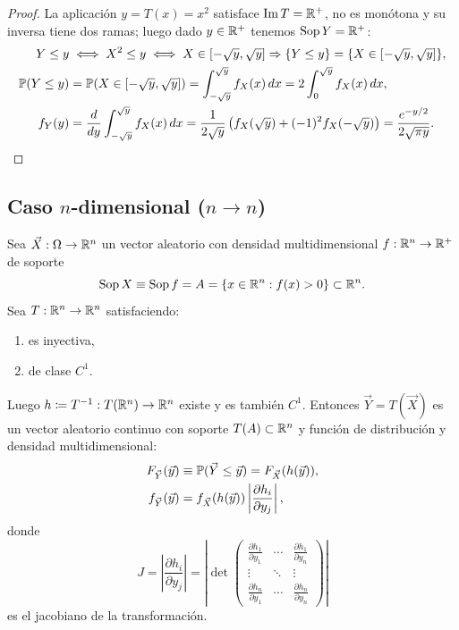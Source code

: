 {\begin{proof}
La aplicación $y = T(x) = x^2$ satisface $\operatorname{Im} T = \mathbb{R}^+$, no es monótona y su inversa tiene dos ramas; luego dado $y \in \mathbb{R}^+$ tenemos $\operatorname{Sop} Y = \mathbb{R}^+$:
\begin{align*}
  Y \le y &\iff X^2 \le y \iff X \in [-\sqrt{y}, \sqrt{y}] \Rightarrow \{Y \le y\} = \{X \in [-\sqrt{y}, \sqrt{y}]\}, \\
  \mathbb{P}(Y \le y) &= \mathbb{P}(X \in [-\sqrt{y}, \sqrt{y}]) = \int_{-\sqrt{y}}^{\sqrt{y}} f_X(x)\,dx = 2\int_0^{\sqrt{y}} f_X(x)\,dx, \\
  f_Y(y) &= \frac{d}{dy}\int_{-\sqrt{y}}^{\sqrt{y}} f_X(x)\,dx = \frac{1}{2\sqrt{y}}\left(f_X(\sqrt{y}) + (-1)^2 f_X(-\sqrt{y})\right) = \frac{e^{-y/2}}{2\sqrt{\pi y}}.
\end{align*}
\end{proof}}

\subsection{Caso $n$-dimensional ($n \to n$)}

\begin{proposicion}[27]
Sea $\vec{X} : \Omega \to \mathbb{R}^n$ un vector aleatorio con densidad multidimensional $f : \mathbb{R}^n \to \mathbb{R}^+$ de soporte
\[
  \operatorname{Sop} X \equiv \operatorname{Sop} f = A = \{x \in \mathbb{R}^n : f(x) > 0\} \subset \mathbb{R}^n.
\]
Sea $T : \mathbb{R}^n \to \mathbb{R}^n$ satisfaciendo:
\begin{enumerate}
  \item es inyectiva,
  \item de clase $C^1$.
\end{enumerate}
Luego $h \coloneqq T^{-1} : T(\mathbb{R}^n) \to \mathbb{R}^n$ existe y es también $C^1$. Entonces $\vec{Y} = T(\vec{X})$ es un vector aleatorio continuo con soporte $T(A) \subset \mathbb{R}^n$ y función de distribución y densidad multidimensional:
\begin{align*}
  F_{\vec{Y}}(\vec{y}) &\equiv \mathbb{P}(\vec{Y} \le \vec{y}) = F_{\vec{X}}(h(\vec{y})), \\
  f_{\vec{Y}}(\vec{y}) &= f_{\vec{X}}(h(\vec{y})) \left|\frac{\partial h_i}{\partial y_j}\right|,
\end{align*}
donde
\[
  J = \left|\frac{\partial h_i}{\partial y_j}\right| = \left|\det \begin{pmatrix} \frac{\partial h_1}{\partial y_1} & \cdots & \frac{\partial h_1}{\partial y_n} \\ \vdots & \ddots & \vdots \\ \frac{\partial h_n}{\partial y_1} & \cdots & \frac{\partial h_n}{\partial y_n} \end{pmatrix}\right|
\]
es el jacobiano de la transformación.
\end{proposicion}

